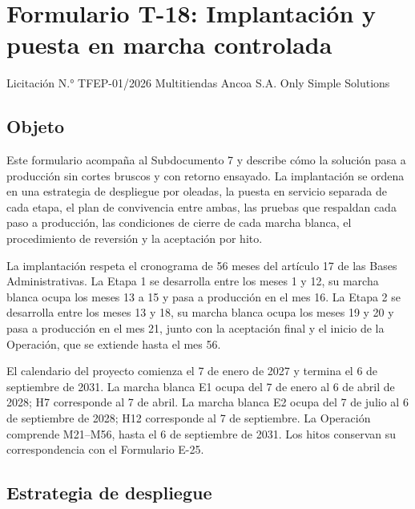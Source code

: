 \documentclass[11pt]{article}
\begin{document}
\renewcommand{\listtablename}{Índice de tablas}
\renewcommand{\tablename}{Tabla}
\renewcommand{\thetable}{T-18.\arabic{table}}

\tableofcontents
\clearpage
\listoftables
\clearpage



\clearpage
\section*{Formulario T-18: Implantación y puesta en marcha controlada}\label{anexo-formulario-t-18}

Licitación N.° TFEP-01/2026
Multitiendas Ancoa S.A.
Only Simple Solutions

\subsection*{Objeto}

Este formulario acompaña al Subdocumento 7 y describe cómo la solución pasa a producción sin cortes bruscos y con retorno ensayado. La implantación se ordena en una estrategia de despliegue por oleadas, la puesta en servicio separada de cada etapa, el plan de convivencia entre ambas, las pruebas que respaldan cada paso a producción, las condiciones de cierre de cada marcha blanca, el procedimiento de reversión y la aceptación por hito.

La implantación respeta el cronograma de 56 meses del artículo 17 de las Bases Administrativas. La Etapa 1 se desarrolla entre los meses 1 y 12, su marcha blanca ocupa los meses 13 a 15 y pasa a producción en el mes 16. La Etapa 2 se desarrolla entre los meses 13 y 18, su marcha blanca ocupa los meses 19 y 20 y pasa a producción en el mes 21, junto con la aceptación final y el inicio de la Operación, que se extiende hasta el mes 56.

El calendario del proyecto comienza el 7 de enero de 2027 y termina el 6 de septiembre de 2031. La marcha blanca E1 ocupa del 7 de enero al 6 de abril de 2028; H7 corresponde al 7 de abril. La marcha blanca E2 ocupa del 7 de julio al 6 de septiembre de 2028; H12 corresponde al 7 de septiembre. La Operación comprende M21--M56, hasta el 6 de septiembre de 2031. Los hitos conservan su correspondencia con el Formulario E-25.

\subsection*{Estrategia de despliegue}
\end{document}
